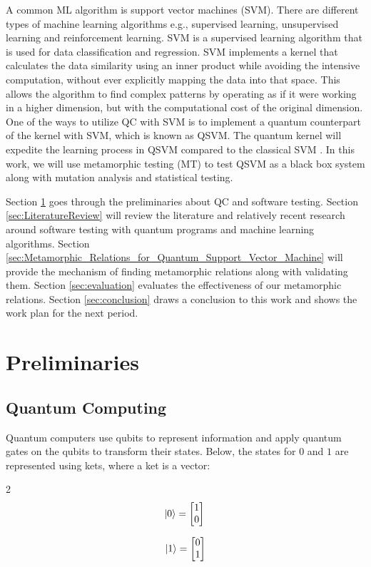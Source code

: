 \documentclass[12pt,a4paper]{article}
\DeclarePairedDelimiter\ket{\lvert}{\rangle}
\begin{document}
	A common ML algorithm is support vector machines (SVM). There are different types of machine learning algorithms e.g., supervised learning, unsupervised learning and reinforcement learning. SVM is a supervised learning algorithm that is used for data classification and regression. SVM implements a kernel that calculates the data similarity using an inner product while avoiding the intensive computation, without ever explicitly mapping the data into that space. This allows the algorithm to find complex patterns by operating as if it were working in a higher dimension, but with the computational cost of the original dimension. One of the ways to utilize QC with SVM is to implement a quantum counterpart of the kernel with SVM, which is known as QSVM. The quantum kernel will expedite the learning process in QSVM compared to the classical SVM \cite{Rebentrost_2014} \cite{Gentinetta_2024}. In this work, we will use metamorphic testing (MT) to test QSVM as a black box system along with mutation analysis and statistical testing. 
	
	Section \ref{sec:preliminaries} goes through the preliminaries about QC and software testing. Section \ref{sec:LiteratureReview} will review the literature and relatively recent research around software testing with quantum programs and machine learning algorithms. Section \ref{sec:Metamorphic_Relations_for_Quantum_Support_Vector_Machine} will provide the mechanism of finding metamorphic relations along with validating them. Section \ref{sec:evaluation} evaluates the effectiveness of our metamorphic relations. Section \ref{sec:conclusion} draws a conclusion to this work and shows the work plan for the next period.
	
	
	\section{Preliminaries}
	\label{sec:preliminaries}
	
	\subsection{Quantum Computing}
	
	Quantum computers use qubits to represent information and apply quantum gates on the qubits to transform their states. Below, the states for $0$ and $1$ are represented using kets, where a ket is a vector:
	
	\begin{multicols}{2}
		\begin{equation*}
			\ket{0} = \begin{bmatrix}
				1 \\ 0
			\end{bmatrix}\\
		\end{equation*}
		
		\begin{equation*}
			\ket{1} = \begin{bmatrix}
				0 \\ 1
			\end{bmatrix}
		\end{equation*}
	\end{multicols}
	
\end{document}
